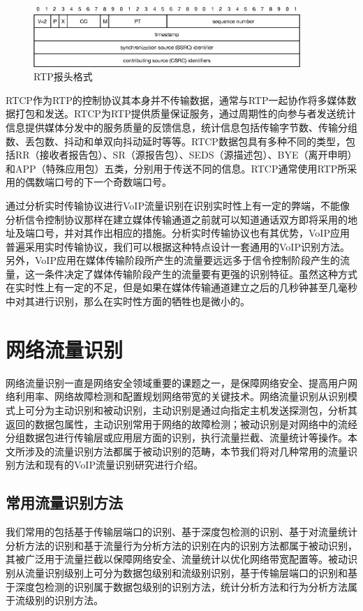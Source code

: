 \begin{figure}[thb]
\begin{center}
\includegraphics[width=0.9\textwidth]{figures/rtp.eps}
\caption{RTP报头格式}\label{fig:rtp}
\end{center}
\end{figure}

RTCP作为RTP的控制协议其本身并不传输数据，通常与RTP一起协作将多媒体数据打包和发送。RTCP为RTP提供质量保证服务，通过周期性的向参与者发送统计信息提供媒体分发中的服务质量的反馈信息，统计信息包括传输字节数、传输分组数、丢包数、抖动和单双向抖动延时等等。RTCP数据包具有多种不同的类型，包括RR（接收者报告包）、SR（源报告包）、SEDS（源描述包）、BYE（离开申明）和APP（特殊应用包）五类，分别用于传送不同的信息。RTCP通常使用RTP所采用的偶数端口号的下一个奇数端口号。

通过分析实时传输协议进行VoIP流量识别在识别实时性上有一定的弊端，不能像分析信令控制协议那样在建立媒体传输通道之前就可以知道通话双方即将采用的地址及端口号，并对其作出相应的措施。分析实时传输协议也有其优势，VoIP应用普遍采用实时传输协议，我们可以根据这种特点设计一套通用的VoIP识别方法。另外，VoIP应用在媒体传输阶段所产生的流量要远远多于信令控制阶段产生的流量，这一条件决定了媒体传输阶段产生的流量要有更强的识别特征。虽然这种方式在实时性上有一定的不足，但是如果在媒体传输通道建立之后的几秒钟甚至几毫秒中对其进行识别，那么在实时性方面的牺牲也是微小的。




\section{网络流量识别}
网络流量识别一直是网络安全领域重要的课题之一，是保障网络安全、提高用户网络利用率、网络故障检测和配置规划网络带宽的关键技术。网络流量识别从识别模式上可分为主动识别和被动识别，主动识别是通过向指定主机发送探测包，分析其返回的数据包属性，主动识别常用于网络的故障检测；被动识别是对网络中的流经分组数据包进行传输层或应用层方面的识别，执行流量拦截、流量统计等操作。本文所涉及的流量识别方法都属于被动识别的范畴，本节我们将对几种常用的流量识别方法和现有的VoIP流量识别研究进行介绍。


\subsection{常用流量识别方法}
我们常用的包括基于传输层端口的识别、基于深度包检测的识别、基于对流量统计分析方法的识别和基于流量行为分析方法的识别在内的识别方法都属于被动识别，其被广泛用于流量拦截以保障网络安全、流量统计以优化网络带宽配置等。被动识别从流量识别级别上可分为数据包级别和流级别识别，基于传输层端口的识别和基于深度包检测的识别属于数据包级别的识别方法，统计分析方法和行为分析方法属于流级别的识别方法。

